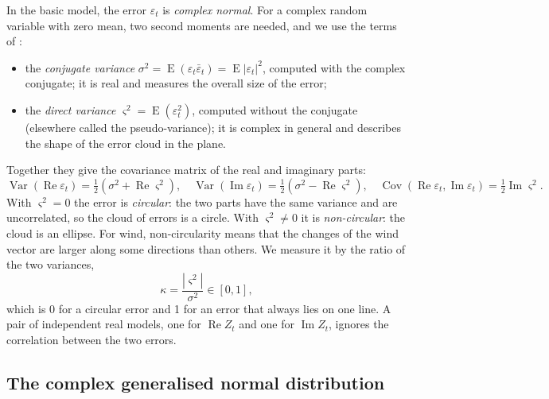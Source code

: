 \documentclass[11pt,a4paper]{article}
\DeclareMathOperator{\E}{E}
\newcommand{\1}{\mathbf{1}}
\renewcommand{\Re}{\operatorname{Re}}
\renewcommand{\Im}{\operatorname{Im}}
\begin{document}
In the basic model, the error $\varepsilon_t$ is \emph{complex normal}. For a complex random
variable with zero mean, two second moments are needed, and we use the terms of
\citet{svetunkov2024}:
\begin{itemize}
  \item the \emph{conjugate variance} $\sigma^2 = \E(\varepsilon_t\bar\varepsilon_t) =
    \E|\varepsilon_t|^2$, computed with the complex conjugate; it is real and measures the overall
    size of the error;
  \item the \emph{direct variance} $\varsigma^2 = \E(\varepsilon_t^2)$, computed without the
    conjugate (elsewhere called the pseudo-variance); it is complex in general and describes the
    shape of the error cloud in the plane.
\end{itemize}
Together they give the covariance matrix of the real and imaginary parts:
\begin{equation}
  \operatorname{Var}(\Re\varepsilon_t) = \tfrac12(\sigma^2 + \Re\varsigma^2), \quad
  \operatorname{Var}(\Im\varepsilon_t) = \tfrac12(\sigma^2 - \Re\varsigma^2), \quad
  \operatorname{Cov}(\Re\varepsilon_t, \Im\varepsilon_t) = \tfrac12\Im\varsigma^2 .
\end{equation}
With $\varsigma^2 = 0$ the error is \emph{circular}: the two parts have the same variance and are
uncorrelated, so the cloud of errors is a circle. With $\varsigma^2 \neq 0$ it is
\emph{non-circular}: the cloud is an ellipse. For wind, non-circularity means that the changes of
the wind vector are larger along some directions than others. We measure it by the ratio of the
two variances,
\begin{equation}\label{eq:noncirc}
  \kappa = \frac{|\varsigma^2|}{\sigma^2} \in [0, 1],
\end{equation}
which is 0 for a circular error and 1 for an error that always lies on one line. A pair of
independent real models, one for $\Re Z_t$ and one for $\Im Z_t$, ignores the correlation between
the two errors.

\subsection{The complex generalised normal distribution}\label{sec:cgnorm}
\end{document}
